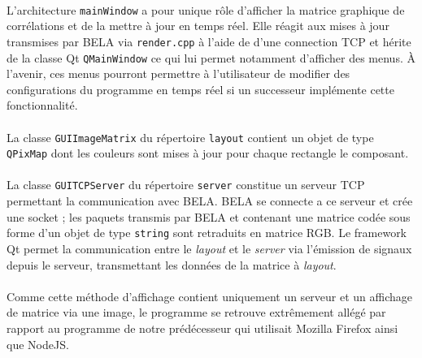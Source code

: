 \paragraph{}
L'architecture \verb!mainWindow! a pour unique rôle d'afficher la
matrice graphique de corrélations et de la mettre à jour en temps
réel. Elle réagit aux mises à jour transmises par BELA via
\verb!render.cpp! à l'aide de d'une connection TCP
et hérite de la classe Qt \verb!QMainWindow! ce qui
lui permet notamment d'afficher des menus. \`{A} l'avenir, ces menus
pourront permettre à l'utilisateur de modifier des configurations du
programme en temps réel si un successeur implémente cette
fonctionnalité.


\paragraph{}
La classe \verb!GUIImageMatrix! du répertoire \verb!layout! contient
un objet de type \verb!QPixMap! dont les couleurs sont mises à jour
pour chaque rectangle le composant.

\paragraph{}
La classe \verb!GUITCPServer! du répertoire \verb!server! constitue un
serveur TCP permettant la communication avec BELA. BELA se connecte a ce
serveur et crée une socket ; les paquets transmis par BELA et
contenant une matrice codée sous forme d'un objet de type
\verb!string! sont retraduits en matrice RGB. Le framework Qt permet
la communication entre le \textit{layout} et le \textit{server} via
l'émission de signaux depuis le serveur, transmettant les données de
la matrice à \textit{layout}.

\paragraph{}
Comme cette méthode d'affichage contient uniquement un serveur et un affichage
de matrice via une image, le programme se retrouve
extrêmement allégé par rapport au programme de notre prédécesseur qui utilisait Mozilla Firefox ainsi que NodeJS.

